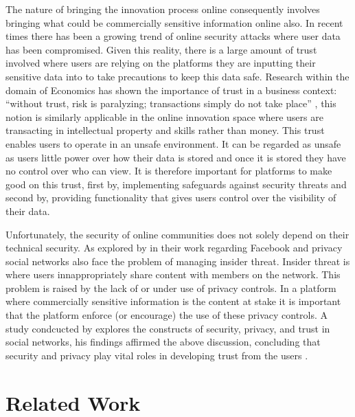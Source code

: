 The nature of bringing the innovation process online consequently involves bringing what could be commercially sensitive information online also. In recent times there has been a growing trend of online security attacks where user data has been compromised. Given this reality, there is a large amount of trust involved where users are relying on the platforms they are inputting their sensitive data into to take precautions to keep this data safe. Research within the domain of Economics has shown the importance of trust in a business context: ``without trust, risk is paralyzing; transactions simply do not take place'' \cite{boyd2002community}, this notion is similarly applicable in the online innovation space where users are transacting in intellectual property and skills rather than money. This trust enables users to operate in an unsafe environment. It can be regarded as unsafe as users little power over how their data is stored and once it is stored they have no control over who can view. It is therefore important for platforms to make good on this trust, first by, implementing safeguards against security threats and second by, providing functionality that gives users control over the visibility of their data.
\par
Unfortunately, the security of online communities does not solely depend on their technical security. As explored by \citeauthor{johnson2012facebook} in their work regarding Facebook and privacy \cite{johnson2012facebook} social networks also face the problem of managing insider threat. Insider threat is where users innappropriately share content with members on the network. This problem is raised by the lack of or under use of privacy controls. In a platform where commercially sensitive information is the content at stake it is important that the platform enforce (or encourage) the use of these privacy controls. A study condcucted by \citeauthor{shin2010effects} explores the constructs of security, privacy, and trust in social networks, his findings affirmed the above discussion, concluding that security and privacy play vital roles in developing trust from the users \cite{shin2010effects}.

\section{Related Work}

